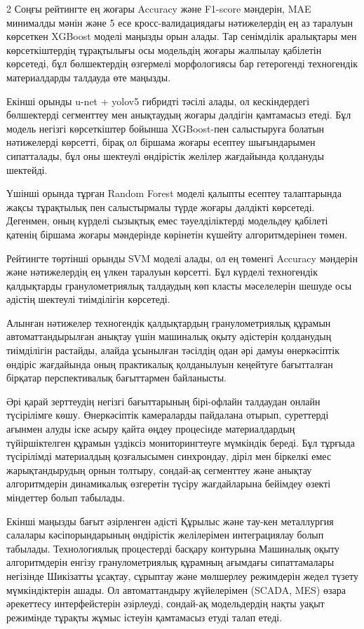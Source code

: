 \begin{multicols}{2}
Соңғы рейтингте ең жоғары Accuracy және F1-score мәндерін, MAE минималды
мәнін және 5 есе кросс-валидациядағы нәтижелердің ең аз таралуын
көрсеткен XGBoost моделі маңызды орын алады. Тар сенімділік аралықтары
мен көрсеткіштердің тұрақтылығы осы модельдің жоғары жалпылау қабілетін
көрсетеді, бұл бөлшектердің өзгермелі морфологиясы бар гетерогенді
техногендік материалдарды талдауда өте маңызды.

Екінші орынды u-net + yolov5 гибридті тәсілі алады, ол кескіндердегі
бөлшектерді сегменттеу мен анықтаудың жоғары дәлдігін қамтамасыз етеді.
Бұл модель негізгі көрсеткіштер бойынша XGBoost-пен салыстыруға болатын
нәтижелерді көрсетті, бірақ ол біршама жоғары есептеу шығындарымен
сипатталады, бұл оны шектеулі өндірістік желілер жағдайында қолдануды
шектейді.

Үшінші орында тұрған Random Forest моделі қалыпты есептеу талаптарында
жақсы тұрақтылық пен салыстырмалы түрде жоғары дәлдікті көрсетеді.
Дегенмен, оның күрделі сызықтық емес тәуелділіктерді модельдеу қабілеті
қатенің біршама жоғары мәндерінде көрінетін күшейту алгоритмдерінен
төмен.

Рейтингте төртінші орынды SVM моделі алады, ол ең төменгі Accuracy
мәндерін және нәтижелердің ең үлкен таралуын көрсетті. Бұл күрделі
техногендік қалдықтарды гранулометриялық талдаудың көп класты
мәселелерін шешуде осы әдістің шектеулі тиімділігін көрсетеді.

Алынған нәтижелер техногендік қалдықтардың гранулометриялық құрамын
автоматтандырылған анықтау үшін машиналық оқыту әдістерін қолданудың
тиімділігін растайды, алайда ұсынылған тәсілдің одан әрі дамуы
өнеркәсіптік өндіріс жағдайында оның практикалық қолданылуын кеңейтуге
бағытталған бірқатар перспективалық бағыттармен байланысты.

Әрі қарай зерттеудің негізгі бағыттарының бірі-офлайн талдаудан онлайн
түсірілімге көшу. Өнеркәсіптік камераларды пайдалана отырып, суреттерді
ағынмен алуды іске асыру қайта өңдеу процесінде материалдардың
түйіршіктелген құрамын үздіксіз мониторингтеуге мүмкіндік береді. Бұл
тұрғыда түсірілімді материалдың қозғалысымен синхрондау, діріл мен
біркелкі емес жарықтандырудың орнын толтыру, сондай-ақ сегменттеу және
анықтау алгоритмдерін динамикалық өзгеретін түсіру жағдайларына бейімдеу
өзекті міндеттер болып табылады.

Екінші маңызды бағыт әзірленген әдісті Құрылыс және тау-кен металлургия
салалары кәсіпорындарының өндірістік желілерімен интеграциялау болып
табылады. Технологиялық процестерді басқару контурына Машиналық оқыту
алгоритмдерін енгізу гранулометриялық құрамның ағымдағы сипаттамалары
негізінде Шикізатты ұсақтау, сұрыптау және мөлшерлеу режимдерін жедел
түзету мүмкіндіктерін ашады. Ол автоматтандыру жүйелерімен (SCADA, MES)
өзара әрекеттесу интерфейстерін әзірлеуді, сондай-ақ модельдердің нақты
уақыт режимінде тұрақты жұмыс істеуін қамтамасыз етуді талап етеді.


\end{multicols}
